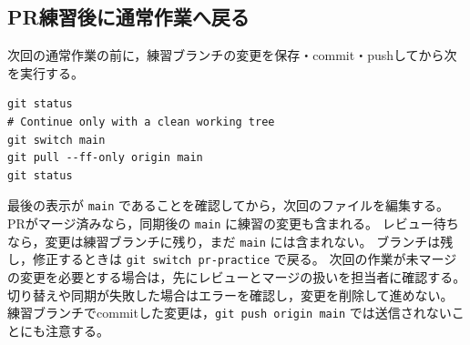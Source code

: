 \hypertarget{prux7df4ux7fd2ux5f8cux306bux901aux5e38ux4f5cux696dux3078ux623bux308b}{%
\subsection{PR練習後に通常作業へ戻る}\label{prux7df4ux7fd2ux5f8cux306bux901aux5e38ux4f5cux696dux3078ux623bux308b}}

次回の通常作業の前に，練習ブランチの変更を保存・commit・pushしてから次を実行する。

\begin{lstlisting}[style=codecell]
git status
# Continue only with a clean working tree
git switch main
git pull --ff-only origin main
git status
\end{lstlisting}

最後の表示が \texttt{main}
であることを確認してから，次回のファイルを編集する。
PRがマージ済みなら，同期後の \texttt{main} に練習の変更も含まれる。
レビュー待ちなら，変更は練習ブランチに残り，まだ \texttt{main}
には含まれない。 ブランチは残し，修正するときは
\texttt{git\ switch\ pr-practice} で戻る。
次回の作業が未マージの変更を必要とする場合は，先にレビューとマージの扱いを担当者に確認する。
切り替えや同期が失敗した場合はエラーを確認し，変更を削除して進めない。
練習ブランチでcommitした変更は，\texttt{git\ push\ origin\ main}
では送信されないことにも注意する。
